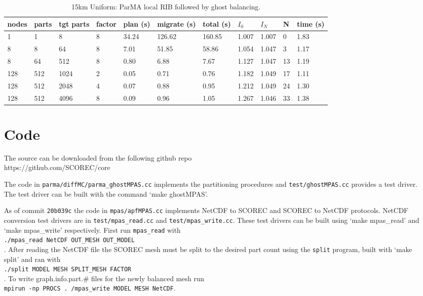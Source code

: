 \documentclass[a4paper]{article}
\begin{document}
\begin{table}
\caption{\label{tab:15kmplrib}15km Uniform: ParMA local RIB followed by ghost balancing.}
\begin{tabular}{  l | l | l | l | l | l | l | l | l | l | l }
    \hline
    nodes & parts & tgt parts & factor & plan (s) & migrate (s) & total (s) & $I_0$ & $I_N$ & N & time (s) \\ \hline
      1 & 1 & 8 & 8 & 34.24 & 126.62 & 160.85 & 1.007 & 1.007 & 0 & 1.83 \\
      8 & 8 & 64 & 8 & 7.01 & 51.85 & 58.86 & 1.054 & 1.047 & 3 & 1.17 \\
      8 & 64 & 512 & 8 & 0.80 & 6.88 & 7.67 & 1.127 & 1.047 & 13 & 1.19 \\
      128 & 512 & 1024 & 2 & 0.05 & 0.71 & 0.76 & 1.182 & 1.049 & 17 & 1.11 \\
      128 & 512 & 2048 & 4 & 0.07 & 0.88 & 0.95 & 1.212 & 1.049 & 24 & 1.30 \\
      128 & 512 & 4096 & 8 & 0.09 & 0.96 & 1.05 & 1.267 & 1.046 & 33 & 1.38 \\
\end{tabular}
\end{table}

\section{Code}

The source can be downloaded from the following github repo \\
https://github.com/SCOREC/core

The code in \texttt{parma/diffMC/parma\_ghostMPAS.cc} implements the partitioning
procedures and \texttt{test/ghostMPAS.cc} provides a test driver.
The test driver can be built with the command `make ghostMPAS'.

As of commit \texttt{20b039c} the code in \texttt{mpas/apfMPAS.cc} implements
NetCDF to SCOREC and SCOREC to NetCDF protocols. NetCDF conversion test drivers
are in \texttt{test/mpas\_read.cc} and \texttt{test/mpas\_write.cc}. These test
drivers can be built using `make mpas\_read'
and `make mpas\_write' respectively. First run \texttt{mpas\_read} with\\
\texttt{./mpas\_read NetCDF OUT\_MESH OUT\_MODEL}\\
.  After reading the NetCDF file the SCOREC mesh must be split to the desired part
count using the \texttt{split} program, built with `make split' and ran with\\
\texttt{./split MODEL MESH SPLIT\_MESH FACTOR}\\
.  To write graph.info.part.\# files for the newly balanced mesh run\\
\texttt{mpirun -np PROCS .  /mpas\_write MODEL MESH NetCDF}.

\newpage


\end{document}
